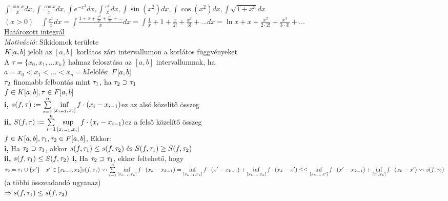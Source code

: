 \documentclass[a4paper,11pt]{article}
\begin{document}
$\int\frac{\sin x}{x}dx,\int\frac{\cos x}{x}dx,\int e^{-x^2}dx,\int\frac{e^x}{x}dx,
\int\sin(x^2)dx,\int\cos(x^2)dx,\int\sqrt{1+x^3}dx$\\[0.2cm]
\pl $(x>0)\quad\int\frac{e^x}{x}dx=\int\frac{1+x+\frac{x^2}{2!}+
\frac{x^3}{3!}+...}{x}dx=\int\frac{1}{x}+1+\frac{x}{2!}+\frac{x^2}{3!}+...dx=
\ln x+x+\frac{x^2}{2\cdot2!}+\frac{x^3}{3\cdot3!}+...$\\[0.4cm]
{\Large \underline{Határozott integrál}}\\[0.4cm]
\textit{Motiváció:} Síkidomok területe\\[0.2cm]
 $K[a,b]$ jelöli az $[a,b]$ korlátos zárt intervallumon a korlátos függvényeket
\\[0.2cm] A $\tau=\{x_0,x_1,...x_n\}$ halmaz felosztása az $[a,b]$
intervallumnak, ha\\[0.2cm]$a=x_0<x_1<...<x_n=b$\hspace{2cm}Jelölés: $F[a,b]$\\[0.2cm]
 $\tau_2$ finomabb felbontás mint $\tau_1$, ha $\tau_2\supset\tau_1$\\[0.2cm]
 $f\in K[a,b],\tau\in F[a,b]$\\[0.2cm]
\textbf{i,} $s(f,\tau):=\sum\limits_{i=1}^{n}\inf\limits_{[x_{i-1},x_i]}f\cdot
(x_i-x_{i-1})$\hspace{0.5cm}ez az alsó közelítő összeg\\[0.2cm]
\textbf{ii,} $S(f,\tau):=\sum\limits_{i=1}^{n}\sup\limits_{[x_{i-1},x_i]}f\cdot
(x_i-x_{i-1})$\hspace{0.4cm}ez a felső közelítő összeg\\[0.3cm]
\tetel $f\in K[a,b],\tau_1,\tau_2\in F[a,b]$, Ekkor:\\[0.2cm]
\textbf{i,} Ha $\tau_2\supset\tau_1$, akkor $s(f,\tau_1)\leq s(f,\tau_2)\text{ és }
S(f,\tau_1)\geq S(f,\tau_2)$\\[0.2cm]\textbf{ii,} $s(f,\tau_1)\leq S(f,\tau_2)$\newpage
\biz\textbf{i,} Ha $\tau_2\supset\tau_1$, ekkor feltehető, hogy $\tau_2=\tau_1\cup\{x'\}\quad
x'\in[x_{k-1},x_k]\\[0.2cm]s(f,\tau_1)\rightsquigarrow\sum\limits_{i=1}^{n}
\inf\limits_{[x_{k-1},x_k]}f\cdot(x_k-x_{k-1})=\inf\limits_{[x_{k-1},x_k]}
f\cdot(x'-x_{k-1})+\inf\limits_{[x_{k-1},x_k]}f\cdot(x_k-x')\leq\\[0.3cm]\leq
\inf\limits_{[x_{k-1},x']}f\cdot(x'-x_{k-1})+\inf\limits_{[x',x_k]}
f\cdot(x_k-x')\rightsquigarrow s(f,\tau_2)$\hspace{0.5cm}
(a többi összeadandó ugyanaz)\\[0.2cm]$\Rightarrow s(f,\tau_1)\leq s(f,\tau_2)$\\[0.2cm]
\end{document}
